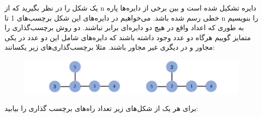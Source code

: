 \p
یک شکل را در نظر بگیرید که از n دایره تشکیل شده است و بین برخی از دایره‌ها پاره خطی رسم شده باشد. می‌خواهیم در دایره‌های این شکل برچسب‌های 1 تا n را بنویسیم 
به طوری که اعداد واقع در هیچ دو دایره‌ای برابر نباشند. دو روش برچسب‌گذاری را متمایز گوییم هرگاه دو عدد وجود داشته باشند که دایره‌های شامل این دو عدد در یکی مجاور و در دیگری غیر مجاور باشند.
مثلا برچسب‌گذاری‌های زیر یکسانند:

\begin{figure}[h]
\centering
\includegraphics[scale = 0.3]{./0.jpg}
\label{fig:mesh2}
\end{figure}

برای هر یک از شکل‌های زیر تعداد راه‌های برچسب گذاری را بیابید:


